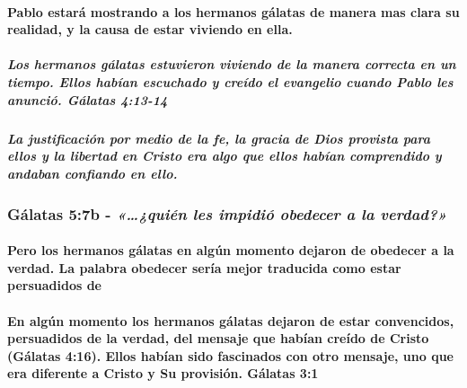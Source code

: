 \documentclass[11a pt,twoside]{article}
\newcommand{\scripture}[1]{%
  {\fontsize{12pt}{16pt}\selectfont\ScriptureFont\itshape #1}%
}
\let\oldsubsubsection\subsubsection
\renewcommand{\subsubsection}{\needspace{4\baselineskip}\oldsubsubsection}
\let\oldparagraph\paragraph
\renewcommand{\paragraph}{\needspace{3\baselineskip}\oldparagraph}
\let\oldsubparagraph\subparagraph
\renewcommand{\subparagraph}{\needspace{2\baselineskip}\oldsubparagraph}
\begin{document}
\paragraph{Pablo estará mostrando a los hermanos gálatas de manera mas
clara su realidad, y la causa de estar viviendo en
ella.}\label{pablo-estaruxe1-mostrando-a-los-hermanos-guxe1latas-de-manera-mas-clara-su-realidad-y-la-causa-de-estar-viviendo-en-ella.}

\subparagraph{Los hermanos gálatas estuvieron viviendo de la manera
correcta en un tiempo. Ellos habían escuchado y creído el evangelio
cuando Pablo les anunció. Gálatas
4:13-14}\label{los-hermanos-guxe1latas-estuvieron-viviendo-de-la-manera-correcta-en-un-tiempo.-ellos-habuxedan-escuchado-y-creuxeddo-el-evangelio-cuando-pablo-les-anunciuxf3.-guxe1latas-413-14}

\subparagraph{La justificación por medio de la fe, la gracia de Dios
provista para ellos y la libertad en Cristo era algo que ellos habían
comprendido y andaban confiando en
ello.}\label{la-justificaciuxf3n-por-medio-de-la-fe-la-gracia-de-dios-provista-para-ellos-y-la-libertad-en-cristo-era-algo-que-ellos-habuxedan-comprendido-y-andaban-confiando-en-ello.}

\subsubsection{\texorpdfstring{Gálatas 5:7b -
\scripture{«…¿quién les impidió obedecer a la verdad?»}}{Gálatas 5:7b - }}\label{guxe1latas-57b---quiuxe9n-les-impidiuxf3-obedecer-a-la-verdad}

\paragraph{Pero los hermanos gálatas en algún momento dejaron de
obedecer a la verdad. La palabra obedecer sería mejor traducida como
estar persuadidos
de}\label{pero-los-hermanos-guxe1latas-en-alguxfan-momento-dejaron-de-obedecer-a-la-verdad.-la-palabra-obedecer-seruxeda-mejor-traducida-como-estar-persuadidos-de}

\paragraph{En algún momento los hermanos gálatas dejaron de estar
convencidos, persuadidos de la verdad, del mensaje que habían creído de
Cristo (Gálatas 4:16). Ellos habían sido fascinados con otro mensaje,
uno que era diferente a Cristo y Su provisión. Gálatas
3:1}\label{en-alguxfan-momento-los-hermanos-guxe1latas-dejaron-de-estar-convencidos-persuadidos-de-la-verdad-del-mensaje-que-habuxedan-creuxeddo-de-cristo-guxe1latas-416.-ellos-habuxedan-sido-fascinados-con-otro-mensaje-uno-que-era-diferente-a-cristo-y-su-provisiuxf3n.-guxe1latas-31}
\end{document}
